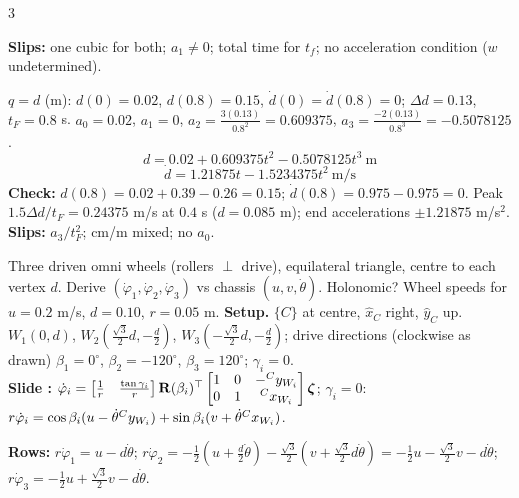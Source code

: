\begin{multicols}{3}
\begin{examq}
\textbf{Slips:} one cubic for both; $a_1\ne0$; total time for $t_f$; no acceleration condition ($w$ undetermined).
\end{examq}
\begin{examq}
\solution
$q=d$ (m): $d(0)=0.02$, $d(0.8)=0.15$, $\dot d(0)=\dot d(0.8)=0$; $\Delta d=0.13$, $t_F=0.8$ s. $a_0=0.02$, $a_1=0$, $a_2=\frac{3(0.13)}{0.8^2}=0.609375$, $a_3=\frac{-2(0.13)}{0.8^3}=-0.5078125$.
\[\boxed{d=0.02+0.609375t^2-0.5078125t^3\ \text{m}}\]\[\dot d=1.21875t-1.5234375t^2\ \text{m/s}\]
\textbf{Check:} $d(0.8)=0.02+0.39-0.26=0.15$; $\dot d(0.8)=0.975-0.975=0$. Peak $1.5\Delta d/t_F=0.24375$ m/s at $0.4$ s ($d=0.085$ m); end accelerations $\pm1.21875$ m/s$^2$. \chk\\
\textbf{Slips:} $a_3/t_F^2$; cm/m mixed; no $a_0$.
\end{examq}
\begin{examq}
Three driven omni wheels (rollers $\perp$ drive), equilateral triangle, centre to each vertex $d$. Derive $(\dot\varphi_1,\dot\varphi_2,\dot\varphi_3)$ vs chassis $(u,v,\dot\theta)$. Holonomic? Wheel speeds for $u=0.2$ m/s, $d=0.10$, $r=0.05$ m.
\solution
\textbf{Setup.} $\{C\}$ at centre, $\hat x_C$ right, $\hat y_C$ up. $W_1(0,d)$, $W_2(\tfrac{\sqrt3}2d,-\tfrac d2)$, $W_3(-\tfrac{\sqrt3}2d,-\tfrac d2)$; drive directions (clockwise as drawn) $\beta_1=0^\circ$, $\beta_2=-120^\circ$, $\beta_3=120^\circ$; $\gamma_i=0$.\\
\textbf{Slide :} $\dot\varphi_i=\begin{bmatrix}\frac1r&\frac{\tan\gamma_i}r\end{bmatrix}\mathbf R(\beta_i)^\top\begin{bmatrix}1&0&-{}^{C}y_{W_{i}}\\0&1&{}^{C}x_{W_{i}}\end{bmatrix}\boldsymbol\zeta$; $\gamma_i=0$: $r\dot\varphi_i=\cos\beta_i(u-\dot\theta{}^{C}y_{W_{i}})+\sin\beta_i(v+\dot\theta{}^{C}x_{W_{i}})$.\\
\end{examq}
\begin{examq}
\textbf{Rows:} $r\dot\varphi_1=u-d\dot\theta$; $r\dot\varphi_2=-\frac12(u+\frac d2\dot\theta)-\frac{\sqrt3}2(v+\frac{\sqrt3}2d\dot\theta)=-\frac12u-\frac{\sqrt3}2v-d\dot\theta$; $r\dot\varphi_3=-\frac12u+\frac{\sqrt3}2v-d\dot\theta$.

\end{examq}
\end{multicols}
